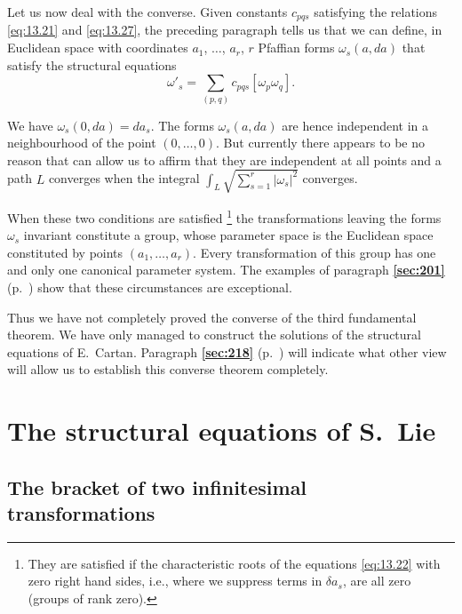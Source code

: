 \documentclass[leqno,11pt]{book}
\numberwithin{equation}{chapter}
\theoremstyle{shape1}
\theoremstyle{shapesmall}
\newcommand{\fsref}[1]{{\rm\textsection\textbf{\ref{sec:#1}}}}
\newcommand{\somespace}{\vspace{9pt}}
\begin{document}
Let us now deal with the converse. Given constants $c_{pqs}$ satisfying the relations \eqref{eq:13.21} and \eqref{eq:13.27}, the preceding paragraph tells us that we can define, in Euclidean space with coordinates $a_{1}$, $\dots$, $a_{r}$, $r$ Pfaffian forms $\omega_{s}(a,da)$ that satisfy the structural equations
\[
\omega'_{s}=\sum_{(p,q)}c_{pqs}[\omega_{p}\omega_{q}].
\]

We have $\omega_{s}(0,da)=da_{s}$. The forms $\omega_{s}(a,da)$ are hence independent in a neighbourhood of the point $(0,\dots,0)$. But currently there appears to be no reason that can allow us to affirm that they are independent at all points and a path $L$ converges when the integral $\displaystyle{\int_{L}\sqrt{\sum_{s=1}^{r}|\omega_{s}|^{2}}}$ converges.

\somespace

{\small
When these two conditions are satisfied \footnote{They are satisfied if the characteristic roots of the equations \eqref{eq:13.22} with zero right hand sides, i.e., where we suppress terms in $\delta a_{s}$, are all zero (groups of rank zero).} the transformations leaving the forms $\omega_{s}$ invariant constitute a group, whose parameter space is the Euclidean space constituted by points $(a_{1},\dots,a_{r})$. Every transformation of this group has one and only one canonical parameter system. The examples of paragraph \fsref{201} (p.~\pageref{sec:201}) show that these circumstances are exceptional.
}

\somespace

Thus we have not completely proved the converse of the third fundamental theorem. We have only managed to construct the solutions of the structural equations of E.~Cartan. Paragraph \fsref{218} (p.~\pageref{sec:218}) will indicate what other view will allow us to establish this converse theorem completely.



\chapter{The structural equations of S.~Lie}
\label{cha:struct-equat-s}

\section{The bracket of two infinitesimal transformations}
\label{sec:brack-two-infin}
\end{document}
